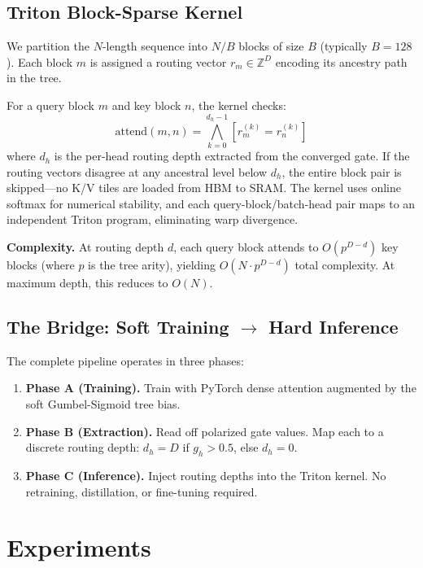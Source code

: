\documentclass[11pt,a4paper]{article}
\begin{document}
\subsection{Triton Block-Sparse Kernel}

We partition the $N$-length sequence into $N/B$ blocks of size $B$ (typically $B = 128$). Each block $m$ is assigned a routing vector $r_m \in \mathbb{Z}^D$ encoding its ancestry path in the tree.

For a query block $m$ and key block $n$, the kernel checks:
\begin{equation}
    \text{attend}(m, n) = \bigwedge_{k=0}^{d_h - 1} \left[ r_m^{(k)} = r_n^{(k)} \right]
\end{equation}
where $d_h$ is the per-head routing depth extracted from the converged gate. If the routing vectors disagree at any ancestral level below $d_h$, the entire block pair is skipped---no K/V tiles are loaded from HBM to SRAM. The kernel uses online softmax \citep{milakov2018softmax} for numerical stability, and each query-block/batch-head pair maps to an independent Triton program, eliminating warp divergence.

\textbf{Complexity.} At routing depth $d$, each query block attends to $O(p^{D-d})$ key blocks (where $p$ is the tree arity), yielding $O(N \cdot p^{D-d})$ total complexity. At maximum depth, this reduces to $O(N)$.

\subsection{The Bridge: Soft Training $\to$ Hard Inference}

The complete pipeline operates in three phases:
\begin{enumerate}
    \item \textbf{Phase A (Training).} Train with PyTorch dense attention augmented by the soft Gumbel-Sigmoid tree bias.
    \item \textbf{Phase B (Extraction).} Read off polarized gate values. Map each to a discrete routing depth: $d_h = D$ if $g_h > 0.5$, else $d_h = 0$.
    \item \textbf{Phase C (Inference).} Inject routing depths into the Triton kernel. No retraining, distillation, or fine-tuning required.
\end{enumerate}

\section{Experiments}
\end{document}
